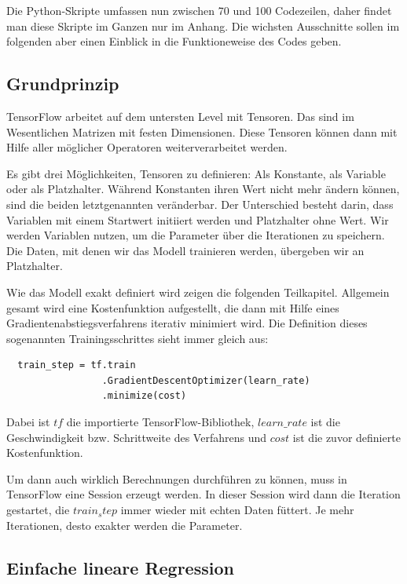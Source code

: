 Die Python-Skripte umfassen nun zwischen 70 und 100 Codezeilen, daher findet man diese Skripte im Ganzen nur im Anhang. Die wichsten Ausschnitte sollen im folgenden aber einen Einblick in die Funktioneweise des Codes geben.

\subsection{Grundprinzip}

TensorFlow arbeitet auf dem untersten Level mit Tensoren. Das sind im Wesentlichen Matrizen mit festen Dimensionen. Diese Tensoren können dann mit Hilfe aller möglicher Operatoren weiterverarbeitet werden.

Es gibt drei Möglichkeiten, Tensoren zu definieren: Als Konstante, als Variable oder als Platzhalter. Während Konstanten ihren Wert nicht mehr ändern können, sind die beiden letztgenannten veränderbar. Der Unterschied besteht darin, dass Variablen mit einem Startwert initiiert werden und Platzhalter ohne Wert. Wir werden Variablen nutzen, um die Parameter über die Iterationen zu speichern. Die Daten, mit denen wir das Modell trainieren werden, übergeben wir an Platzhalter.

Wie das Modell exakt definiert wird zeigen die folgenden Teilkapitel. Allgemein gesamt wird eine Kostenfunktion aufgestellt, die dann mit Hilfe eines Gradientenabstiegsverfahrens iterativ minimiert wird. Die Definition dieses sogenannten Trainingsschrittes sieht immer gleich aus:

\begin{verbatim}
  train_step = tf.train
                 .GradientDescentOptimizer(learn_rate)
                 .minimize(cost)
\end{verbatim}

Dabei ist $tf$ die importierte TensorFlow-Bibliothek, $learn\_rate$ ist die Geschwindigkeit bzw. Schrittweite des Verfahrens und $cost$ ist die zuvor definierte Kostenfunktion.

Um dann auch wirklich Berechnungen durchführen zu können, muss in TensorFlow eine Session erzeugt werden. In dieser Session wird dann die Iteration gestartet, die $train_step$ immer wieder mit echten Daten füttert. Je mehr Iterationen, desto exakter werden die Parameter.

\subsection{Einfache lineare Regression}

